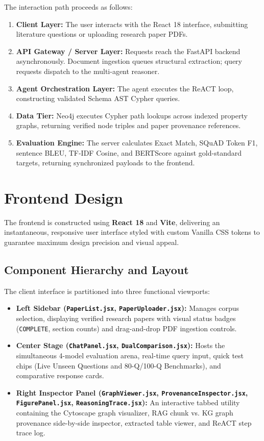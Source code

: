The interaction path proceeds as follows:
\begin{enumerate}
    \item \textbf{Client Layer:} The user interacts with the React 18 interface, submitting literature questions or uploading research paper PDFs.
    \item \textbf{API Gateway / Server Layer:} Requests reach the FastAPI backend asynchronously. Document ingestion queues structural extraction; query requests dispatch to the multi-agent reasoner.
    \item \textbf{Agent Orchestration Layer:} The agent executes the ReACT loop, constructing validated Schema AST Cypher queries.
    \item \textbf{Data Tier:} Neo4j executes Cypher path lookups across indexed property graphs, returning verified node triples and paper provenance references.
    \item \textbf{Evaluation Engine:} The server calculates Exact Match, SQuAD Token F1, sentence BLEU, TF-IDF Cosine, and BERTScore against gold-standard targets, returning synchronized payloads to the frontend.
\end{enumerate}

\section{Frontend Design}
The frontend is constructed using \textbf{React 18} and \textbf{Vite}, delivering an instantaneous, responsive user interface styled with custom Vanilla CSS tokens to guarantee maximum design precision and visual appeal.

\subsection{Component Hierarchy and Layout}
The client interface is partitioned into three functional viewports:
\begin{itemize}
    \item \textbf{Left Sidebar (\texttt{PaperList.jsx}, \texttt{PaperUploader.jsx}):} Manages corpus selection, displaying verified research papers with visual status badges (\texttt{COMPLETE}, section counts) and drag-and-drop PDF ingestion controls.
    \item \textbf{Center Stage (\texttt{ChatPanel.jsx}, \texttt{DualComparison.jsx}):} Hosts the simultaneous 4-model evaluation arena, real-time query input, quick test chips (Live Unseen Questions and 80-Q/100-Q Benchmarks), and comparative response cards.
    \item \textbf{Right Inspector Panel (\texttt{GraphViewer.jsx}, \texttt{ProvenanceInspector.jsx}, \texttt{FigurePanel.jsx}, \texttt{ReasoningTrace.jsx}):} An interactive tabbed utility containing the Cytoscape graph visualizer, RAG chunk vs. KG graph provenance side-by-side inspector, extracted table viewer, and ReACT step trace log.
\end{itemize}

